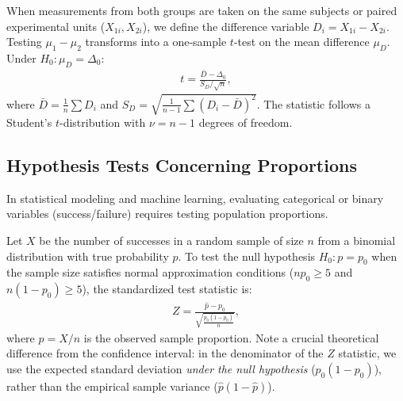 \begin{definicion}
	When measurements from both groups are taken on the same subjects or paired experimental units ($X_{1i}, X_{2i}$), we define the difference variable $D_i = X_{1i} - X_{2i}$. Testing $\mu_1 - \mu_2$ transforms into a one-sample $t$-test on the mean difference $\mu_D$. Under $H_0: \mu_D = \Delta_0$:
	\begin{align}
		t = \frac{\bar{D} - \Delta_0}{S_D / \sqrt{n}},
	\end{align}
	where $\bar{D} = \frac{1}{n}\sum D_i$ and $S_D = \sqrt{\frac{1}{n-1}\sum (D_i - \bar{D})^2}$. The statistic follows a Student's $t$-distribution with $\nu = n - 1$ degrees of freedom.
\end{definicion}

\subsection{Hypothesis Tests Concerning Proportions}

In statistical modeling and machine learning, evaluating categorical or binary variables (success/failure) requires testing population proportions.

\begin{teorema}
	Let $X$ be the number of successes in a random sample of size $n$ from a binomial distribution with true probability $p$. To test the null hypothesis $H_0: p = p_0$ when the sample size satisfies normal approximation conditions ($n p_0 \geq 5$ and $n(1-p_0) \geq 5$), the standardized test statistic is:
	\begin{align}
		Z = \frac{\hat{p} - p_0}{\sqrt{\frac{p_0(1-p_0)}{n}}},
	\end{align}
	where $\hat{p} = X/n$ is the observed sample proportion. Note a crucial theoretical difference from the confidence interval: in the denominator of the $Z$ statistic, we use the expected standard deviation \emph{under the null hypothesis} ($p_0(1-p_0)$), rather than the empirical sample variance ($\hat{p}(1-\hat{p})$).
\end{teorema}

